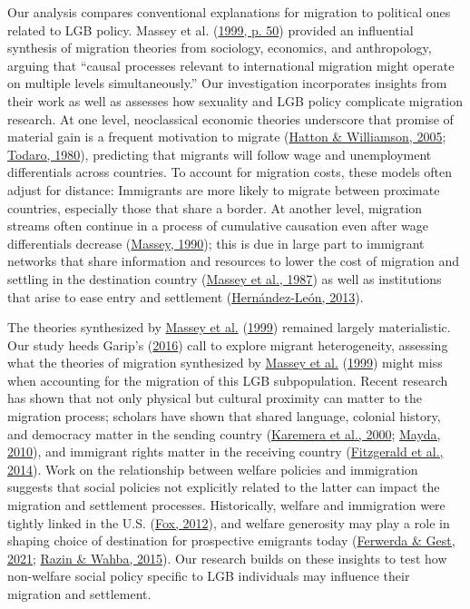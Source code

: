 \documentclass[
  12pt,
]{article}
\begin{document}
Our analysis compares conventional explanations for migration to political ones related to LGB policy. Massey et al. (\protect\hyperlink{ref-massey_1999}{1999, p. 50}) provided an influential synthesis of migration theories from sociology, economics, and anthropology, arguing that ``causal processes relevant to international migration might operate on multiple levels simultaneously.'' Our investigation incorporates insights from their work as well as assesses how sexuality and LGB policy complicate migration research. At one level, neoclassical economic theories underscore that promise of material gain is a frequent motivation to migrate (\protect\hyperlink{ref-hatton_2005a}{Hatton \& Williamson, 2005}; \protect\hyperlink{ref-todaro_1980}{Todaro, 1980}), predicting that migrants will follow wage and unemployment differentials across countries. To account for migration costs, these models often adjust for distance: Immigrants are more likely to migrate between proximate countries, especially those that share a border. At another level, migration streams often continue in a process of cumulative causation even after wage differentials decrease (\protect\hyperlink{ref-massey_1990_social}{Massey, 1990}); this is due in large part to immigrant networks that share information and resources to lower the cost of migration and settling in the destination country (\protect\hyperlink{ref-massey_1987}{Massey et al., 1987}) as well as institutions that arise to ease entry and settlement (\protect\hyperlink{ref-hernandez-leon_2013}{Hernández-León, 2013}).

The theories synthesized by \protect\hyperlink{ref-massey_1999}{Massey et al.} (\protect\hyperlink{ref-massey_1999}{1999}) remained largely materialistic.
Our study heeds Garip's (\protect\hyperlink{ref-garip_2016}{2016}) call to explore migrant heterogeneity, assessing what the theories of migration synthesized by \protect\hyperlink{ref-massey_1999}{Massey et al.} (\protect\hyperlink{ref-massey_1999}{1999}) might miss when accounting for the migration of this LGB subpopulation. Recent research has shown that not only physical but cultural proximity can matter to the migration process; scholars have shown that shared language, colonial history, and democracy matter in the sending country (\protect\hyperlink{ref-karemera_2000}{Karemera et al., 2000}; \protect\hyperlink{ref-mayda_2010}{Mayda, 2010}), and immigrant rights matter in the receiving country (\protect\hyperlink{ref-fitzgerald_2014}{Fitzgerald et al., 2014}). Work on the relationship between welfare policies and immigration suggests that social policies not explicitly related to the latter can impact the migration and settlement processes. Historically, welfare and immigration were tightly linked in the U.S. (\protect\hyperlink{ref-fox_2012}{Fox, 2012}), and welfare generosity may play a role in shaping choice of destination for prospective emigrants today (\protect\hyperlink{ref-ferwerda_2021_pull}{Ferwerda \& Gest, 2021}; \protect\hyperlink{ref-razin_2015}{Razin \& Wahba, 2015}). Our research builds on these insights to test how non-welfare social policy specific to LGB individuals may influence their migration and settlement.
\end{document}
